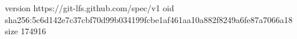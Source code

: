 version https://git-lfs.github.com/spec/v1
oid sha256:5c6d142e7c37cbf70d99b034199fcbe1af461aa10a882f8249a6fe87a7066a18
size 174916
